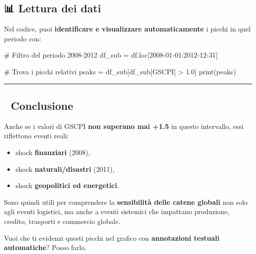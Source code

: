 \documentclass[
  11pt,
  letterpaper,
  DIV=11,
  numbers=noendperiod]{scrartcl}
\newenvironment{Shaded}{\begin{snugshade}}{\end{snugshade}}
\newcommand{\BuiltInTok}[1]{\textcolor[rgb]{0.00,0.23,0.31}{#1}}
\newcommand{\CommentTok}[1]{\textcolor[rgb]{0.37,0.37,0.37}{#1}}
\newcommand{\FloatTok}[1]{\textcolor[rgb]{0.68,0.00,0.00}{#1}}
\newcommand{\NormalTok}[1]{\textcolor[rgb]{0.00,0.23,0.31}{#1}}
\newcommand{\OperatorTok}[1]{\textcolor[rgb]{0.37,0.37,0.37}{#1}}
\newcommand{\StringTok}[1]{\textcolor[rgb]{0.13,0.47,0.30}{#1}}
\providecommand{\tightlist}{%
  \setlength{\itemsep}{0pt}\setlength{\parskip}{0pt}}
\begin{document}
\subsection{📊 Lettura dei dati}\label{lettura-dei-dati}

Nel codice, puoi \textbf{identificare e visualizzare automaticamente} i
picchi in quel periodo con:

\begin{Shaded}
\begin{Highlighting}[]
\CommentTok{\# Filtro del periodo 2008{-}2012}
\NormalTok{df\_sub }\OperatorTok{=}\NormalTok{ df.loc[}\StringTok{\textquotesingle{}2008{-}01{-}01\textquotesingle{}}\NormalTok{:}\StringTok{\textquotesingle{}2012{-}12{-}31\textquotesingle{}}\NormalTok{]}

\CommentTok{\# Trova i picchi relativi}
\NormalTok{peaks }\OperatorTok{=}\NormalTok{ df\_sub[df\_sub[}\StringTok{\textquotesingle{}GSCPI\textquotesingle{}}\NormalTok{] }\OperatorTok{\textgreater{}} \FloatTok{1.0}\NormalTok{]}
\BuiltInTok{print}\NormalTok{(peaks)}
\end{Highlighting}
\end{Shaded}

\begin{center}\rule{0.5\linewidth}{0.5pt}\end{center}

\subsection{📍 Conclusione}\label{conclusione}

Anche se i valori di GSCPI \textbf{non superano mai +1.5} in questo
intervallo, essi riflettono eventi reali:

\begin{itemize}
\tightlist
\item
  shock \textbf{finanziari} (2008),
\item
  shock \textbf{naturali/disastri} (2011),
\item
  shock \textbf{geopolitici ed energetici}.
\end{itemize}

Sono quindi utili per comprendere la \textbf{sensibilità delle catene
globali} non solo agli eventi logistici, ma anche a eventi sistemici che
impattano produzione, credito, trasporti e commercio globale.

Vuoi che ti evidenzi questi picchi nel grafico con \textbf{annotazioni
testuali automatiche}? Posso farlo.
\end{document}
